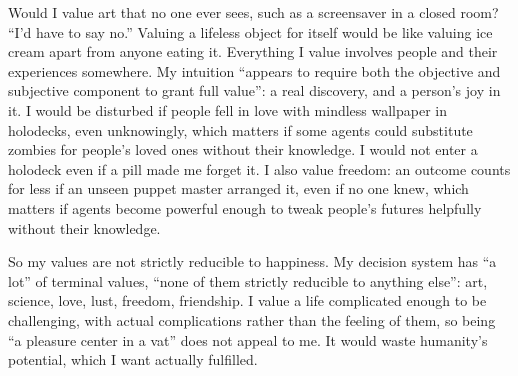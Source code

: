 Would I value art that no one ever sees, such as a screensaver in a closed room? ``I'd have to say no.'' Valuing a lifeless object for itself would be like valuing ice cream apart from anyone eating it. Everything I value involves people and their experiences somewhere.  My intuition ``appears to require both the objective and subjective component to grant full value'': a real discovery, and a person's joy in it. I would be disturbed if people fell in love with mindless wallpaper in holodecks, even unknowingly, which matters if some agents could substitute zombies for people's loved ones without their knowledge. I would not enter a holodeck even if a pill made me forget it.  I also value freedom: an outcome counts for less if an unseen puppet master arranged it, even if no one knew, which matters if agents become powerful enough to tweak people's futures helpfully without their knowledge.

So my values are not strictly reducible to happiness. My decision system has ``a lot'' of terminal values, ``none of them strictly reducible to anything else'': art, science, love, lust, freedom, friendship.  I value a life complicated enough to be challenging, with actual complications rather than the feeling of them, so being ``a pleasure center in a vat'' does not appeal to me. It would waste humanity's potential, which I want actually fulfilled.
